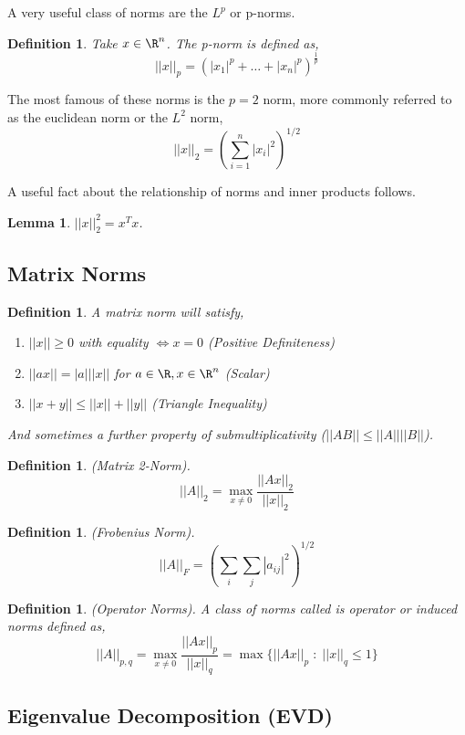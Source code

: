\documentclass[twoside]{article}
\newtheorem{lemma}[theorem]{Lemma}
\newtheorem{definition}[theorem]{Definition}
\begin{document}
A very useful class of norms are the $L^p$ or p-norms.

\begin{definition} Take $x \in \R^n$. The p-norm is defined as,
$$||x||_p = (|x_1|^p+\dots+|x_n|^p)^{\frac{1}{p}}$$
\end{definition} 

The most famous of these norms is the $p=2$ norm, more commonly referred to as the euclidean norm or the $L^2$ norm, $$||x||_2 = (\sum^n_{i=1}|x_i|^2)^{1/2}$$

A useful fact about the relationship of norms and inner products follows.

\begin{lemma}$||x||^2_2 = x^Tx$.
\end{lemma}



\subsection{Matrix Norms}

\begin{definition} A matrix norm will satisfy,
\begin{enumerate}
\item $||x|| \geq 0$ with equality $\iff x = 0$ (Positive Definiteness)
\item $||ax|| = |a|||x||$ for $ a \in \R, x \in \R^n$ (Scalar)
\item $||x+y||\leq||x||+||y||$ (Triangle Inequality) 
\end{enumerate}
And sometimes a further property of submultiplicativity ($||AB||\leq||A||||B||$).
\end{definition}

\begin{definition}(Matrix 2-Norm).
$$||A||_2 = \max_{x\neq0}\frac{||Ax||_2}{||x||_2}$$
\end{definition}

\begin{definition}(Frobenius Norm).
$$||A||_F = (\sum_i\sum_j|a_{ij}|^2)^{1/2}$$
\end{definition}

\begin{definition}(Operator Norms). A class of norms called is operator or induced norms defined as,
$$||A||_{p,q} = \max_{x\neq0}\frac{||Ax||_p}{||x||_q} = \max\{||Ax||_p \; : \; ||x||_q \leq 1 \}$$
\end{definition}

\subsection{Eigenvalue Decomposition (EVD)}
\end{document}
